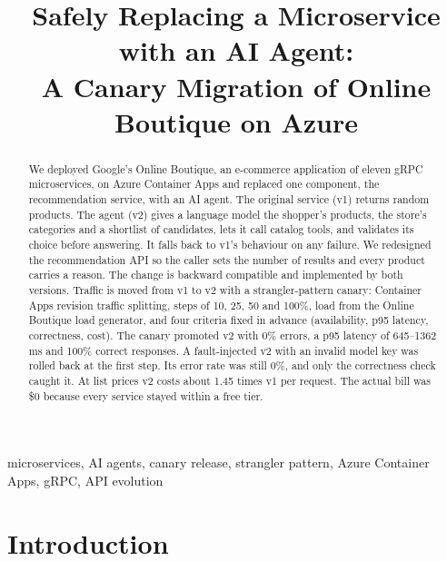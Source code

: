 \documentclass[conference]{IEEEtran}
\begin{document}
\title{Safely Replacing a Microservice with an AI Agent:\\
A Canary Migration of Online Boutique on Azure}

\author{
}

\maketitle

\begin{abstract}
We deployed Google's Online Boutique, an e-commerce application of eleven
gRPC microservices, on Azure Container Apps and replaced one component, the
recommendation service, with an AI agent. The original service (v1) returns
random products. The agent (v2) gives a language model the shopper's
products, the store's categories and a shortlist of candidates, lets it call
catalog tools, and validates its choice before answering. It falls back to
v1's behaviour on any failure. We redesigned the recommendation API so the
caller sets the number of results and every product carries a reason. The
change is backward compatible and implemented by both versions. Traffic is
moved from v1 to v2 with a strangler-pattern canary: Container Apps
revision traffic splitting, steps of 10, 25, 50 and 100\%, load from the
Online Boutique load generator, and four criteria fixed in advance
(availability, p95 latency, correctness, cost). The canary promoted v2 with
0\% errors, a p95 latency of 645--1362\,ms and 100\% correct responses. A
fault-injected v2 with an invalid model key was rolled back at the first
step. Its error rate was still 0\%, and only the correctness check caught
it. At list prices v2 costs about 1.45 times v1 per request. The actual bill
was \$0 because every service stayed within a free tier.
\end{abstract}

\begin{IEEEkeywords}
microservices, AI agents, canary release, strangler pattern, Azure Container Apps, gRPC, API evolution
\end{IEEEkeywords}

\section{Introduction}
\end{document}

